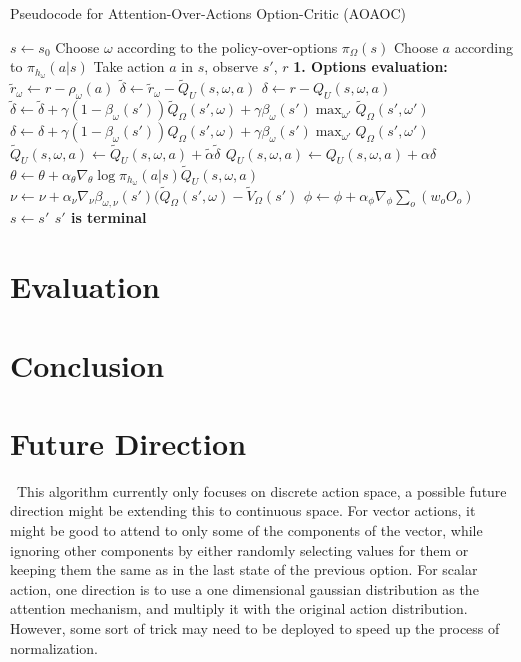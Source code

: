 \documentclass{article}
\begin{document}
	\begin{algorithm}[H]
	\caption{Pseudocode for Attention-Over-Actions Option-Critic (AOAOC)}
	\begin{algorithmic}
		\vspace{1.5mm}
		\State $s \leftarrow s_0$
		\State Choose $\omega$ according to the policy-over-options $\pi_\Omega(s)$
		\Repeat
		\State Choose $a$ according to $\pi_{h_\omega}(a|s)$
		\State Take action $a$ in $s$, observe $s'$, $r$\vspace{3mm}
		\State \bfseries{1. Options evaluation:}
		\State $\widetilde{r}_\omega\leftarrow r-\rho_\omega(a)$
		\State \normalfont $\widetilde{\delta} \leftarrow \widetilde{r}_\omega - \widetilde{Q}_U(s,\omega,a)$
		\State \normalfont $\delta \leftarrow r - Q_U(s,\omega,a)$
		\State $\widetilde{\delta} \leftarrow \widetilde{\delta}+\gamma(1-\beta_\omega(s'))\widetilde{Q}_\Omega(s',\omega)+\gamma \beta_\omega(s')\max_{\omega'}\widetilde{Q}_\Omega(s',\omega')$
		\State $\delta \leftarrow \delta+\gamma(1-\beta_\omega(s'))Q_\Omega(s',\omega)+\gamma \beta_\omega(s')\max_{\omega'}Q_\Omega(s',\omega')$
		\EndIf
		\State $\widetilde{Q}_U(s,\omega,a)\leftarrow \widetilde{Q}_U(s,\omega,a) + \widetilde{\alpha} \widetilde{\delta}$
		\State $Q_U(s,\omega,a)\leftarrow Q_U(s,\omega,a) + \alpha \delta$
		\vspace{3mm}
		\State $\theta \leftarrow \theta + \alpha_\theta \nabla_\theta \log \pi_{h_\omega}(a|s)\widetilde{Q}_U(s,\omega,a)$
		\State $\nu \leftarrow \nu + \alpha_\nu \nabla_\nu \beta_{\omega,\nu}(s')(\widetilde{Q}_\Omega(s',\omega)-\widetilde{V}_\Omega(s')$
		\State \normalfont $\phi \leftarrow \phi + \alpha_\phi \nabla_\phi \sum_{o} (w_o O_o)$
		\EndIf
		\State $s \leftarrow s'$
		\Until $s'$ is terminal
		
	\end{algorithmic}
	\end{algorithm}
	\section{Evaluation}
	\section{Conclusion}
	\section{Future Direction}
	\qquad \ This algorithm currently only focuses on discrete action space, a possible future direction might be extending this to continuous space. For vector actions, it might be good to attend to only some of the components of the vector, while ignoring other components by either randomly selecting values for them or keeping them the same as in the last state of the previous option. For scalar action, one direction is to use a one dimensional gaussian distribution as the attention mechanism, and multiply it with the original action distribution. However, some sort of trick may need to be deployed to speed up the process of normalization.
\end{document}

